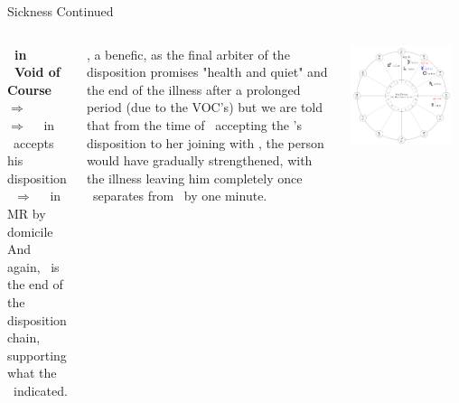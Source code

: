 \begin{frame}[t]{Sickness Continued}
\begin{columns}[T, onlytextwidth]

\textbf{\Mercury\ in \Aries\ Void of Course} $\Rightarrow$ \Taurus \\
$\Rightarrow$ \Sextile\ \Venus\ in \Taurus\ accepts his disposition\footnotemark[1] \\
\Venus\ $\Rightarrow$ \Trine\ \Jupiter\ in \Taurus\, MR by domicile \\
And again, \Jupiter\ is the end of the disposition chain, supporting what the \Moon\ indicated.
\vspace{0.2cm}

\Jupiter, a benefic, as the final arbiter of the disposition promises "health and quiet" and the end of the illness after a prolonged period (due to the VOC's) but we are told that from the time of \Venus\ accepting the \Moon's disposition to her joining with \Jupiter, the person would have gradually strengthened, with the illness leaving him completely once \Venus\ separates from \Jupiter\ by one minute.

\begin{center}
{\includegraphics[width=0.9\textwidth]{charts/21b-chart-sickness}} \\
\vspace{-0.2cm}
\end{center}
\end{columns}
\end{frame}
